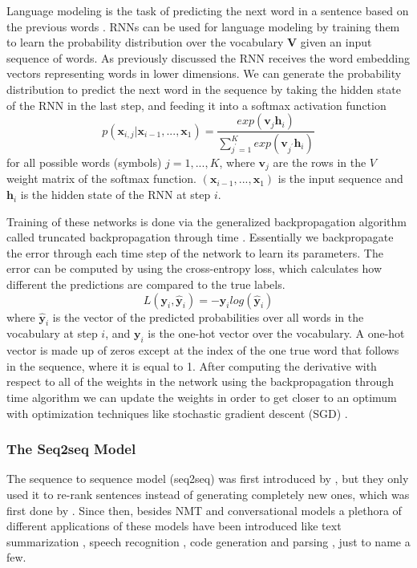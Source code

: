 \documentclass[12pt]{article}
\begin{document}
Language modeling is the task of predicting the next word in a sentence based on the previous words \cite{Bengio:2003}. RNNs can be used for language modeling by training them to learn the probability distribution over the vocabulary \(\bm{V}\) given an input sequence of words. As previously discussed the RNN receives the word embedding vectors representing words in lower dimensions. We can generate the probability distribution to predict the next word in the sequence by taking the hidden state of the RNN in the last step, and feeding it into a softmax activation function
\begin{equation} \label{eq231b}
p(\bm{x}_{i,j}|\bm{x}_{i-1},...,\bm{x}_1)=\frac{exp(\bm{v}_j\bm{h}_i)}{\sum_{j^{'}=1}^{K}exp(\bm{v}_{j^{'}}\bm{h}_i)}
\end{equation}
for all possible words (symbols) \(j=1,...,K\), where \(\bm{v}_j\) are the rows in the \(V\) weight matrix of the softmax function. \((\bm{x}_{i-1},...,\bm{x}_1)\) is the input sequence and \(\bm{h}_i\) is the hidden state of the RNN at step \(i\).

Training of these networks is done via the generalized backpropagation algorithm called truncated backpropagation through time \cite{Werbos:1990,RNN:1988}. Essentially we backpropagate the error through each time step of the network to learn its parameters. The error can be computed by using the cross-entropy loss, which calculates how different the predictions are compared to the true labels.
\begin{equation} \label{eq231c}
L(\bm{y}_i,\bm{\hat{y}}_{i})=-\bm{y}_i log(\bm{\hat{y}}_{i})
\end{equation}
where \(\bm{\hat{y}}_{i}\) is the vector of the predicted probabilities over all words in the vocabulary at step \(i\), and \(\bm{y}_i\) is the one-hot vector over the vocabulary. A one-hot vector is made up of zeros except at the index of the one true word that follows in the sequence, where it is equal to 1. After computing the derivative with respect to all of the weights in the network using the backpropagation through time algorithm we can update the weights in order to get closer to an optimum with optimization techniques like stochastic gradient descent (SGD) \cite{SGD:2010}. 

\subsubsection{The Seq2seq Model} \label{sssec:232}
The sequence to sequence model (seq2seq) was first introduced by \cite{Cho:2014}, but they only used it to re-rank sentences instead of generating completely new ones, which was first done by \cite{Sutskever:2014}. Since then, besides NMT and conversational models a plethora of different applications of these models have been introduced like text summarization \cite{Nallapati:2016}, speech recognition \cite{Chiu:2017}, code generation \cite{Rico:2017} and parsing \cite{Konstas:2017}, just to name a few.
\end{document}
